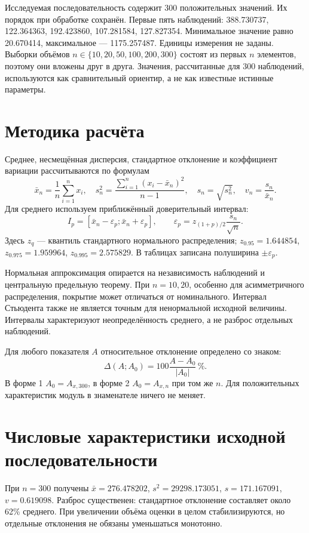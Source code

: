 \documentclass[11pt,a4paper]{article}
\begin{document}
Исследуемая последовательность содержит 300 положительных значений. Их порядок при обработке сохранён. Первые пять наблюдений: 388.730737, 122.364363, 192.423860, 107.281584, 127.827354. Минимальное значение равно 20.670414, максимальное --- 1175.257487. Единицы измерения не заданы. Выборки объёмов $n\in\{10,20,50,100,200,300\}$ состоят из первых $n$ элементов, поэтому они вложены друг в друга. Значения, рассчитанные для 300 наблюдений, используются как сравнительный ориентир, а не как известные истинные параметры.

\section{Методика расчёта}
Среднее, несмещённая дисперсия, стандартное отклонение и коэффициент вариации рассчитываются по формулам
\begin{equation}
\bar x_n=\frac1n\sum_{i=1}^n x_i,\quad
s_n^2=\frac{\sum_{i=1}^n(x_i-\bar x_n)^2}{n-1},\quad
s_n=\sqrt{s_n^2},\quad v_n=\frac{s_n}{\bar x_n}.
\end{equation}
Для среднего используем приближённый доверительный интервал:
\begin{equation}
I_p=\left[\bar x_n-\varepsilon_p;\bar x_n+\varepsilon_p\right],\qquad
\varepsilon_p=z_{(1+p)/2}\frac{s_n}{\sqrt n}.
\end{equation}
Здесь $z_q$ --- квантиль стандартного нормального распределения; $z_{0.95}=1.644854$, $z_{0.975}=1.959964$, $z_{0.995}=2.575829$. В таблицах записана полуширина $\pm\varepsilon_p$.

Нормальная аппроксимация опирается на независимость наблюдений и центральную предельную теорему. При $n=10,20$, особенно для асимметричного распределения, покрытие может отличаться от номинального. Интервал Стьюдента также не является точным для ненормальной исходной величины. Интервалы характеризуют неопределённость среднего, а не разброс отдельных наблюдений.

Для любого показателя $A$ относительное отклонение определено со знаком:
\begin{equation}\Delta(A;A_0)=100\frac{A-A_0}{|A_0|}\,\% .\end{equation}
В форме 1 $A_0=A_{x,300}$, в форме 2 $A_0=A_{x,n}$ при том же $n$. Для положительных характеристик модуль в знаменателе ничего не меняет.

\section{Числовые характеристики исходной последовательности}
\begin{table}[H]\centering\caption{Форма 1. Характеристики исходной последовательности и отклонения от выборки $n=300$}
\small\setlength{\tabcolsep}{4pt}\end{table}
При $n=300$ получены $\bar x=276.478202$, $s^2=29298.173051$, $s=171.167091$, $v=0.619098$. Разброс существенен: стандартное отклонение составляет около 62\% среднего. При увеличении объёма оценки в целом стабилизируются, но отдельные отклонения не обязаны уменьшаться монотонно.
\end{document}
